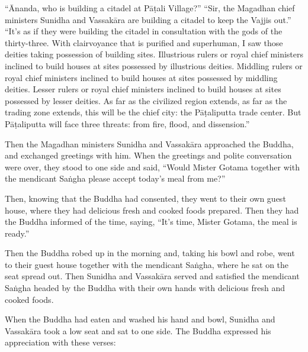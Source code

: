 \documentclass[12pt,openany]{book}%
\begin{document}
“Ānanda, who is building a citadel at \textsanskrit{Pāṭali} Village?” “Sir, the Magadhan chief ministers Sunidha and \textsanskrit{Vassakāra} are building a citadel to keep the Vajjis out.” “It’s as if they were building the citadel in consultation with the gods of the thirty-three. With clairvoyance that is purified and superhuman, I saw those deities taking possession of building sites. Illustrious rulers or royal chief ministers inclined to build houses at sites possessed by illustrious deities. Middling rulers or royal chief ministers inclined to build houses at sites possessed by middling deities. Lesser rulers or royal chief ministers inclined to build houses at sites possessed by lesser deities. As far as the civilized region extends, as far as the trading zone extends, this will be the chief city: the \textsanskrit{Pāṭaliputta} trade center. But \textsanskrit{Pāṭaliputta} will face three threats: from fire, flood, and dissension.” 

Then the Magadhan ministers Sunidha and \textsanskrit{Vassakāra} approached the Buddha, and exchanged greetings with him. When the greetings and polite conversation were over, they stood to one side and said, “Would Mister Gotama together with the mendicant \textsanskrit{Saṅgha} please accept today’s meal from me?” 

Then, knowing that the Buddha had consented, they went to their own guest house, where they had delicious fresh and cooked foods prepared. Then they had the Buddha informed of the time, saying, “It’s time, Mister Gotama, the meal is ready.” 

Then the Buddha robed up in the morning and, taking his bowl and robe, went to their guest house together with the mendicant \textsanskrit{Saṅgha}, where he sat on the seat spread out. Then Sunidha and \textsanskrit{Vassakāra} served and satisfied the mendicant \textsanskrit{Saṅgha} headed by the Buddha with their own hands with delicious fresh and cooked foods. 

When the Buddha had eaten and washed his hand and bowl, Sunidha and \textsanskrit{Vassakāra} took a low seat and sat to one side. The Buddha expressed his appreciation with these verses: 
\end{document}
